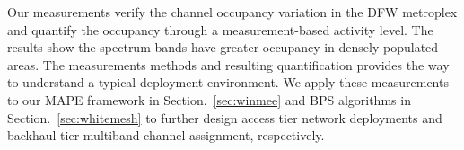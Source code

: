 Our measurements verify the channel occupancy variation in the DFW metroplex and quantify the occupancy
through a measurement-based activity level. The results show the spectrum bands have greater occupancy in
densely-populated areas. The measurements 
methods and resulting quantification provides the way to 
understand a typical deployment environment. We apply these 
measurements to our MAPE framework in Section.~\ref{sec:winmee} and BPS algorithms in Section.~\ref{sec:whitemesh} to 
further design access tier network deployments and backhaul tier multiband channel assignment, respectively.
